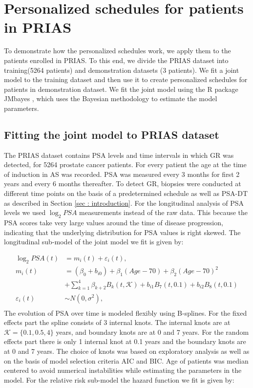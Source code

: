 
\section{Personalized schedules for patients in PRIAS}
\label{sec : pers_schedule_PRIAS}
To demonstrate how the personalized schedules work, we apply them to the patients enrolled in PRIAS. To this end, we divide the PRIAS dataset into training(5264 patients) and demonstration datasets (3 patients). We fit a joint model to the training dataset and then use it to create personalized schedules for patients in demonstration dataset. We fit the joint model using the R package JMbayes \citep{rizopoulosJMbayes}, which uses the Bayesian methodology to estimate the model parameters.

\subsection{Fitting the joint model to PRIAS dataset}
\label{subsec : jm_fit_prias}
The PRIAS dataset contains PSA levels and time intervals in which GR was detected, for 5264 prostate cancer patients. For every patient the age at the time of induction in AS was recorded. PSA was measured every 3 months for first 2 years and every 6 months thereafter. To detect GR, biopsies were conducted at different time points on the basis of a predetermined schedule as well as PSA-DT as described in Section \ref{sec : introduction}. For the longitudinal analysis of PSA levels we used $\log_2 PSA$ measurements instead of the raw data. This because the PSA scores take very large values around the time of disease progression, indicating that the underlying distribution for PSA values is right skewed. The longitudinal sub-model of the joint model we fit is given by:

\begin{equation}
\label{eq : long_model_prias}
\begin{aligned}
\log_2 PSA(t) &= m_i(t) + \varepsilon_i(t), \\
m_i(t) &= (\beta_0 + b_{i0}) + \beta_1 (Age-70) + \beta_2 (Age-70)^2\\ 
&+ \sum_{k=1}^4 \beta_{k+2} B_k(t,\mathcal{K}) + b_{i1} B_7(t, 0.1) + b_{i2} B_8(t, 0.1) \\
\varepsilon_i(t) & \sim N(0, \sigma^2),\\
\end{aligned}
\end{equation}
The evolution of PSA over time is modeled flexibly using B-splines. For the fixed effects part the spline consists of 3 internal knots. The internal knots are at $\mathcal{K} =\{0.1, 0.5, 4\}$ years, and boundary knots are at 0 and 7 years. For the random effects part there is only 1 internal knot at 0.1 years and the boundary knots are at 0 and 7 years. The choice of knots was based on exploratory analysis as well as on the basis of model selection criteria AIC and BIC. Age of patients was median centered to avoid numerical instabilities while estimating the parameters in the model. For the relative risk sub-model the hazard function we fit is given by:

